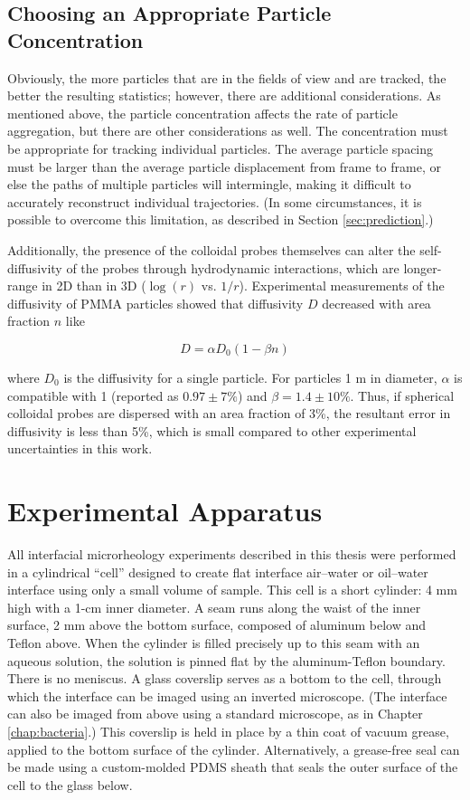 \subsection{Choosing an Appropriate Particle Concentration}

Obviously, the more particles that are in the fields of view and are tracked, the better the resulting statistics; however, there are additional considerations. As mentioned above, the particle concentration affects the rate of particle aggregation, but there are other considerations as well. The concentration must be appropriate for tracking individual particles. The average particle spacing must be larger than the average particle displacement from frame to frame, or else the paths of multiple particles will intermingle, making it difficult to accurately reconstruct individual trajectories\cite{Crocker1996}. (In some circumstances, it is possible to overcome this limitation, as described in Section \ref{sec:prediction}.)

Additionally, the presence of the colloidal probes themselves can alter the self-diffusivity of the probes through hydrodynamic interactions\cite{Peng2008a}, which are longer-range in 2D than in 3D ($\log(r)$ vs. $1/r$). Experimental measurements of the diffusivity of PMMA particles showed that diffusivity $D$ decreased with area fraction $n$ like

\begin{equation}
D = \alpha D_0(1 - \beta n)
\end{equation}

\noindent where $D_0$ is the diffusivity for a single particle. For particles 1 \textmu m in diameter, $\alpha$ is compatible with 1 (reported as $0.97 \pm 7\%$) and $\beta = 1.4 \pm 10\%$\cite{Peng2008a}. Thus, if spherical colloidal probes are dispersed with an area fraction of 3\%, the resultant error in diffusivity is less than 5\%, which is small compared to other experimental uncertainties in this work.

\section{Experimental Apparatus}

All interfacial microrheology experiments described in this thesis were performed in a cylindrical ``cell'' designed to create flat interface air--water or oil--water interface using only a small volume of sample. This cell is a short cylinder: 4 mm high with a 1-cm inner diameter. A seam runs along the waist of the inner surface, 2 mm above the bottom surface, composed of aluminum below and Teflon above. When the cylinder is filled precisely up to this seam with an aqueous solution, the solution is pinned flat by the aluminum-Teflon boundary. There is no meniscus. A glass coverslip serves as a bottom to the cell, through which the interface can be imaged using an inverted microscope. (The interface can also be imaged from above using a standard microscope, as in Chapter \ref{chap:bacteria}.) This coverslip is held in place by a thin coat of vacuum grease, applied to the bottom surface of the cylinder. Alternatively, a grease-free seal can be made using a custom-molded PDMS sheath that seals the outer surface of the cell to the glass below.

